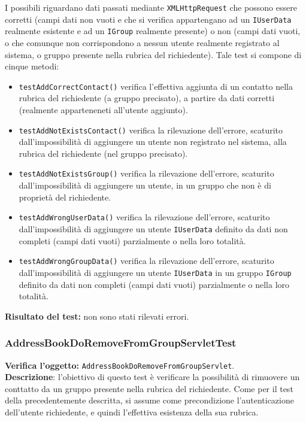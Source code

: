 I possibili  riguardano dati passati mediante \texttt{XMLHttpRequest} che possono essere corretti (campi dati non vuoti e che si verifica appartengano ad un \texttt{IUserData} realmente esistente e ad un \texttt{IGroup} realmente presente) o non (campi dati vuoti, o che comunque non corrispondono a nessun utente realmente registrato al sistema, o gruppo presente nella rubrica del richiedente).
Tale test si compone di cinque metodi:
\begin{itemize}
\item \texttt{testAddCorrectContact()} verifica l'effettiva aggiunta di un contatto nella rubrica del richiedente (a gruppo precisato), a partire da dati corretti (realmente apparteneneti all'utente aggiunto).
\item \texttt{testAddNotExistsContact()} verifica la rilevazione dell'errore, scaturito dall'impossibilità di aggiungere un utente non registrato nel sistema, alla rubrica del richiedente (nel gruppo precisato).
\item \texttt{testAddNotExistsGroup()} verifica la rilevazione dell'errore, scaturito dall'impossibilità di aggiungere un utente, in un gruppo che non è di proprietà del richiedente.
\item \texttt{testAddWrongUserData()} verifica la rilevazione dell'errore, scaturito dall'impossibilità di aggiungere un utente \texttt{IUserData} definito da dati non completi (campi dati vuoti) parzialmente o nella loro totalità.
\item \texttt{testAddWrongGroupData()} verifica la rilevazione dell'errore, scaturito dall'impossibilità di aggiungere un utente \texttt{IUserData} in un gruppo \texttt{IGroup} definito da dati non completi (campi dati vuoti) parzialmente o nella loro totalità.
\end{itemize}
\textbf{Risultato del test:} non sono stati rilevati errori.

\subsubsection{AddressBookDoRemoveFromGroupServletTest}
\textbf{Verifica l'oggetto:} \texttt{AddressBookDoRemoveFromGroupServlet}.\\
\textbf{Descrizione}: l'obiettivo di questo test è verificare la possibilità di rimuovere un conttatto da un gruppo presente nella rubrica del richiedente. Come per il test della  precedentemente descritta, si assume come precondizione l'autenticazione dell'utente richiedente, e quindi l'effettiva esistenza della sua rubrica.

